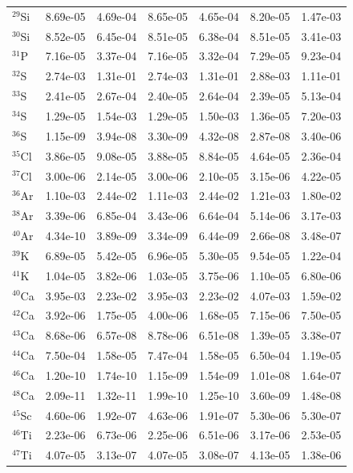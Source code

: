 \begin{table}
\begin{tabular}{l|cc|cc|cc}
$^{29}$Si & 8.69e-05 & 4.69e-04 & 8.65e-05 & 4.65e-04 & 8.20e-05 & 1.47e-03\\
$^{30}$Si & 8.52e-05 & 6.45e-04 & 8.51e-05 & 6.38e-04 & 8.51e-05 & 3.41e-03\\
$^{31}$P & 7.16e-05 & 3.37e-04 & 7.16e-05 & 3.32e-04 & 7.29e-05 & 9.23e-04\\
$^{32}$S & 2.74e-03 & 1.31e-01 & 2.74e-03 & 1.31e-01 & 2.88e-03 & 1.11e-01\\
$^{33}$S & 2.41e-05 & 2.67e-04 & 2.40e-05 & 2.64e-04 & 2.39e-05 & 5.13e-04\\
$^{34}$S & 1.29e-05 & 1.54e-03 & 1.29e-05 & 1.50e-03 & 1.36e-05 & 7.20e-03\\
$^{36}$S & 1.15e-09 & 3.94e-08 & 3.30e-09 & 4.32e-08 & 2.87e-08 & 3.40e-06\\
$^{35}$Cl & 3.86e-05 & 9.08e-05 & 3.88e-05 & 8.84e-05 & 4.64e-05 & 2.36e-04\\
$^{37}$Cl & 3.00e-06 & 2.14e-05 & 3.00e-06 & 2.10e-05 & 3.15e-06 & 4.22e-05\\
$^{36}$Ar & 1.10e-03 & 2.44e-02 & 1.11e-03 & 2.44e-02 & 1.21e-03 & 1.80e-02\\
$^{38}$Ar & 3.39e-06 & 6.85e-04 & 3.43e-06 & 6.64e-04 & 5.14e-06 & 3.17e-03\\
$^{40}$Ar & 4.34e-10 & 3.89e-09 & 3.34e-09 & 6.44e-09 & 2.66e-08 & 3.48e-07\\
$^{39}$K & 6.89e-05 & 5.42e-05 & 6.96e-05 & 5.30e-05 & 9.54e-05 & 1.22e-04\\
$^{41}$K & 1.04e-05 & 3.82e-06 & 1.03e-05 & 3.75e-06 & 1.10e-05 & 6.80e-06\\
$^{40}$Ca & 3.95e-03 & 2.23e-02 & 3.95e-03 & 2.23e-02 & 4.07e-03 & 1.59e-02\\
$^{42}$Ca & 3.92e-06 & 1.75e-05 & 4.00e-06 & 1.68e-05 & 7.15e-06 & 7.50e-05\\
$^{43}$Ca & 8.68e-06 & 6.57e-08 & 8.78e-06 & 6.51e-08 & 1.39e-05 & 3.38e-07\\
$^{44}$Ca & 7.50e-04 & 1.58e-05 & 7.47e-04 & 1.58e-05 & 6.50e-04 & 1.19e-05\\
$^{46}$Ca & 1.20e-10 & 1.74e-10 & 1.15e-09 & 1.54e-09 & 1.01e-08 & 1.64e-07\\
$^{48}$Ca & 2.09e-11 & 1.32e-11 & 1.99e-10 & 1.25e-10 & 3.60e-09 & 1.48e-08\\
$^{45}$Sc & 4.60e-06 & 1.92e-07 & 4.63e-06 & 1.91e-07 & 5.30e-06 & 5.30e-07\\
$^{46}$Ti & 2.23e-06 & 6.73e-06 & 2.25e-06 & 6.51e-06 & 3.17e-06 & 2.53e-05\\
$^{47}$Ti & 4.07e-05 & 3.13e-07 & 4.07e-05 & 3.08e-07 & 4.13e-05 & 1.38e-06\\

\end{tabular}
\end{table}
